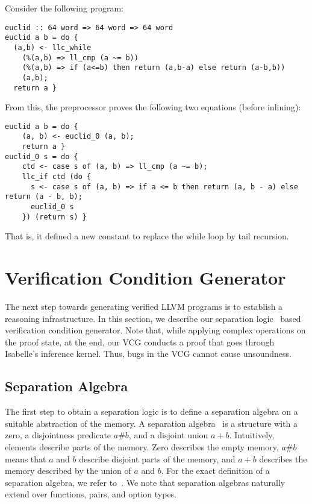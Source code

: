 \documentclass[a4paper,USenglish,cleveref, autoref]{lipics-v2019}
\begin{document}

\begin{example}\label{ex:euclid}
Consider the following program:
\begin{lstlisting}
euclid :: 64 word => 64 word => 64 word
euclid a b = do {
  (a,b) <- llc_while 
    (%(a,b) => ll_cmp (a ~= b))
    (%(a,b) => if (a<=b) then return (a,b-a) else return (a-b,b))
    (a,b);
  return a }
\end{lstlisting}
From this, the preprocessor proves the following two equations (before inlining):
\begin{lstlisting}
euclid a b = do {
    (a, b) <- euclid_0 (a, b);
    return a }
euclid_0 s = do {
    ctd <- case s of (a, b) => ll_cmp (a ~= b);
    llc_if ctd (do {
      s <- case s of (a, b) => if a <= b then return (a, b - a) else return (a - b, b);
      euclid_0 s
    }) (return s) }
\end{lstlisting}
That is, it defined a new constant  to replace the while loop by tail recursion.
\end{example}



\section{Verification Condition Generator}\label{sec:vcg}
The next step towards generating verified LLVM programs is to establish a reasoning infrastructure. 
In this section, we describe our separation logic~\cite{Rey02} based verification condition generator.
Note that, while applying complex operations on the proof state, at the end, our VCG conducts a proof 
that goes through Isabelle's inference kernel. Thus, bugs in the VCG cannot cause unsoundness.

\subsection{Separation Algebra}
The first step to obtain a separation logic is to define a separation algebra on a suitable abstraction of the memory.
A separation algebra~\cite{CHY07} is a structure with a zero, a disjointness predicate $a\#b$, 
and a disjoint union $a+b$.
Intuitively, elements describe parts of the memory. 
Zero describes the empty memory, $a\#b$ means that $a$ and $b$ describe disjoint parts of the memory,
and $a+b$ describes the memory described by the union of $a$ and $b$. 
For the exact definition of a separation algebra, we refer to~\cite{CHY07,KKB12}. We note that 
separation algebras naturally extend over functions, pairs, and option types. 
\end{document}
